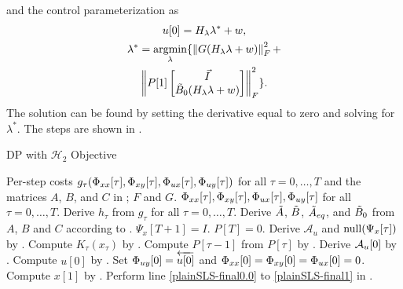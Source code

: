 and the control parameterization as
\begin{equation}\label{eqn:K0_H2}
    \begin{gathered}
        u[0] = H_{\lambda}\lambda^* + w,\\
        \lambda^* = \operatorname*{argmin}_{\lambda} \{ \left\lVert  G (H_{\lambda}\lambda + w)  \right\rVert_F^2 + \\
        \left\lVert  P[1] \begin{bmatrix}\Vec{I}\\ \tilde{B}_0(H_{\lambda}\lambda + w)\end{bmatrix}  \right\rVert_F^2 \}.
    \end{gathered}
\end{equation}
The solution can be found by setting the derivative equal to zero and solving for $\lambda^*$. The steps are shown 
in .

\begin{algorithm}
    \caption{DP with $\mathcal{H}_2$ Objective}
    \label{alg:H2}
    \begin{algorithmic}[1]
    \REQUIRE Per-step costs $g_{\tau}(\Phi_{xx}[\tau],\Phi_{xy}[\tau],\Phi_{ux}[\tau],\Phi_{uy}[\tau])$ for all $\tau = 0, \dots, T$ and the matrices $A$, $B$, and $C$ in ; $F$ and $G$.
    \ENSURE $\Phi_{xx}[\tau],\Phi_{xy}[\tau],\Phi_{ux}[\tau],\Phi_{uy}[\tau]$ for all $\tau = 0, \dots, T$.
    \STATE Derive $h_\tau$ from $g_{\tau}$ for all $\tau = 0, \dots, T$.
    \STATE Derive $\tilde{A}$, $\tilde{B}$, $\tilde{A}_{eq}$, and $\tilde{B}_0$ from $A$, $B$ and $C$ according to .
    \STATE $\Psi_x[T+1] = I$.
    \STATE $P[T]=0$. %
    \STATE Derive $\mathcal{A}_u$ and $\operatorname{null}(\Psi_x[\tau])$ by .
    \STATE Compute $K_{\tau}(x_{\tau})$ by .
    \STATE Compute $P[\tau-1]$ from $P[\tau]$ by .
    \ENDFOR
    \STATE Derive $\mathcal{A}_u[0]$ by .
    \STATE Compute $u[0]$ by .
	\STATE Set $\Phi_{uy}[0] = \overleftarrow{u[0]}$ and $\Phi_{xx}[0] = \Phi_{xy}[0] = \Phi_{ux}[0] = 0$.
    \STATE Compute $x[1]$ by .
    \STATE Perform line \ref{plainSLS-final0.0} to \ref{plainSLS-final1} in .
    \end{algorithmic}
\end{algorithm}

